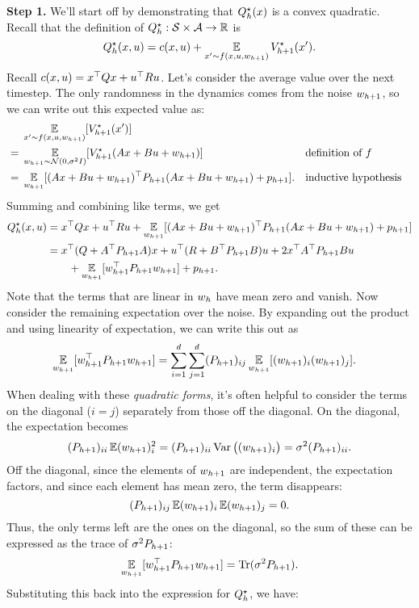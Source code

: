 \documentclass[\main/main]{subfiles}
\begin{document}
\textbf{Step 1.} We'll start off by demonstrating that $Q^\star_h(x)$ is a convex quadratic.
Recall that the definition of $Q^\star_h : \mathcal{S} \times \mathcal{A} \to \mathbb{R}$ is \[
    Q^\star_h(x, u) = c(x, u) + \operatorname*{\mathbb{E}}_{x' \sim f(x, u, w_{h+1})} V^\star_{h+1}(x').
\]
Recall $c(x, u) = x^\top Q x + u^\top R u$. Let's consider the average value
over the next timestep. The only randomness in the dynamics comes from the noise
$w_{h+1}$, so we can write out this expected value as:
\begin{align*}
    & \operatorname*{\mathbb{E}}_{x' \sim f(x, u, w_{h+1})} [V^\star_{h+1}(x')] \\
    {} = {} & \operatorname*{\mathbb{E}}_{w_{h+1} \sim \mathcal{N}(0, \sigma^2 I)} [V^\star_{h+1}(A x + B u + w_{h+1})] && \text{definition of } f \\
    {} = {} & \operatorname*{\mathbb{E}}_{w_{h+1}} [ (A x + B u + w_{h+1})^\top P_{h+1} (A x + B u + w_{h+1}) + p_{h+1} ]. && \text{inductive hypothesis}
\end{align*}
Summing and combining like terms, we get \begin{align*}
    Q^\star_h(x, u) &= x^\top Q x + u^\top R u + \operatorname*{\mathbb{E}}_{w_{h+1}} [(A x + B u + w_{h+1})^\top P_{h+1} (A x + B u + w_{h+1}) + p_{h+1}] \\
    &= x^\top (Q + A^\top P_{h+1} A)x + u^\top (R + B^\top P_{h+1} B) u + 2 x^\top A^\top P_{h+1} B u \\
    &\qquad + \operatorname*{\mathbb{E}}_{w_{h+1}} [w_{h+1}^\top P_{h+1} w_{h+1}] + p_{h+1}.
\end{align*}
Note that the terms that are linear in $w_h$ have mean zero and vanish.
Now consider the remaining expectation over the noise. By expanding out the product and using linearity of
expectation, we can write this out as \begin{align*}
    \operatorname*{\mathbb{E}}_{w_{h+1}} [w_{h+1}^\top P_{h+1} w_{h+1}] &= \sum_{i=1}^d \sum_{j=1}^d (P_{h+1})_{ij} \operatorname*{\mathbb{E}}_{w_{h+1}} [(w_{h+1})_i (w_{h+1})_j].
\end{align*}
When dealing with these \emph{quadratic forms}, it's often helpful to consider the terms
on the diagonal ($i = j$) separately from those off the diagonal. On the diagonal, the
expectation becomes \[ (P_{h+1})_{ii} \operatorname*{\mathbb{E}} (w_{h+1})_i^2 = (P_{h+1})_{ii} \operatorname*{\textrm{Var}} \big((w_{h+1})_i \big) = \sigma^2 (P_{h+1})_{ii}. \]
Off the diagonal, since the elements of $w_{h+1}$ are independent,
the expectation factors, and since each element has mean zero, the term disappears: \[ (P_{h+1})_{ij} \operatorname*{\mathbb{E}} (w_{h+1})_i \operatorname*{\mathbb{E}} (w_{h+1})_j = 0. \]
Thus, the only terms left are the ones on the diagonal, so the sum of these can
be expressed as the trace of $\sigma^2 P_{h+1}$: \[
    \operatorname*{\mathbb{E}}_{w_{h+1}} [w_{h+1}^\top P_{h+1} w_{h+1}] = \operatorname*{\textrm{Tr}}(\sigma^2 P_{h+1}).
\]
Substituting this back into the expression for $Q^\star_h$, we have:
\end{document}
